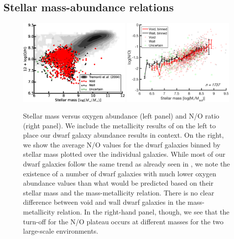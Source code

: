\subsection{Stellar mass-abundance relations}\label{sec:Mass}

\begin{figure}
    \centering
    \includegraphics[width=0.49\textwidth]{Images/Paper3/MZ_1sig_I06relations_dwarf_SF_t3_dust_NSA_python}
    \includegraphics[width=0.49\textwidth]{Images/Paper3/MNO_1sig_I06relations_dwarf_SF_t3_dust_NSA_scatterMbin}
    \caption[$M_*$ versus N/O for star-forming dwarf galaxies]{Stellar mass 
    versus oxygen abundance (left panel) and N/O ratio (right panel).  We 
    include the metallicity results of \cite{Tremonti04} on the left to place 
    our dwarf galaxy abundance results in context.  On the right, we show the 
    average N/O values for the dwarf galaxies binned by stellar mass plotted 
    over the individual galaxies.  While most of our dwarf galaxies follow the 
    same trend as already seen in \cite{Tremonti04}, we note the existence of a 
    number of dwarf galaxies with much lower oxygen abundance values than what 
    would be predicted based on their stellar mass and the mass-metallicity 
    relation.  There is no clear difference between void and wall dwarf galaxies 
    in the mass-metallicity relation.  In the right-hand panel, though, we see 
    that the turn-off for the N/O plateau occurs at different masses for the two 
    large-scale environments.}
    \label{fig:M_NO}
\end{figure}

